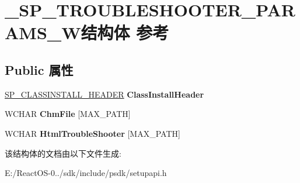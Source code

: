 \hypertarget{struct___s_p___t_r_o_u_b_l_e_s_h_o_o_t_e_r___p_a_r_a_m_s___w}{}\section{\+\_\+\+S\+P\+\_\+\+T\+R\+O\+U\+B\+L\+E\+S\+H\+O\+O\+T\+E\+R\+\_\+\+P\+A\+R\+A\+M\+S\+\_\+\+W结构体 参考}
\label{struct___s_p___t_r_o_u_b_l_e_s_h_o_o_t_e_r___p_a_r_a_m_s___w}
\subsection*{Public 属性}
\begin{DoxyCompactItemize}
\item 
\mbox{\label{struct___s_p___t_r_o_u_b_l_e_s_h_o_o_t_e_r___p_a_r_a_m_s___w_a9fb9dc0fb20aef42c8e4d48aa23ed024}} 
\hyperlink{struct___s_p___c_l_a_s_s_i_n_s_t_a_l_l___h_e_a_d_e_r}{S\+P\+\_\+\+C\+L\+A\+S\+S\+I\+N\+S\+T\+A\+L\+L\+\_\+\+H\+E\+A\+D\+ER} {\bfseries Class\+Install\+Header}
\item 
\mbox{\label{struct___s_p___t_r_o_u_b_l_e_s_h_o_o_t_e_r___p_a_r_a_m_s___w_a864cd2c31b8d56feb04f12ffcfb93761}} 
W\+C\+H\+AR {\bfseries Chm\+File} \mbox{[}M\+A\+X\+\_\+\+P\+A\+TH\mbox{]}
\item 
\mbox{\label{struct___s_p___t_r_o_u_b_l_e_s_h_o_o_t_e_r___p_a_r_a_m_s___w_a7c56c7e1a850aa922e3de58ad497fd17}} 
W\+C\+H\+AR {\bfseries Html\+Trouble\+Shooter} \mbox{[}M\+A\+X\+\_\+\+P\+A\+TH\mbox{]}
\end{DoxyCompactItemize}


该结构体的文档由以下文件生成\+:\begin{DoxyCompactItemize}
\item 
E\+:/\+React\+O\+S-\/0../sdk/include/psdk/setupapi.\+h\end{DoxyCompactItemize}
